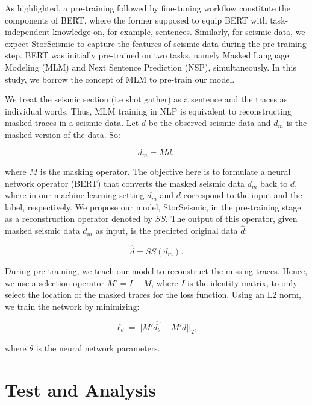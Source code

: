 \documentclass{article}
\begin{document}
As \cite{rogers2020primer} highlighted, a pre-training followed by fine-tuning workflow constitute the components of BERT, where the former supposed to equip BERT with task-independent knowledge on, for example, sentences. Similarly, for seismic data, we expect StorSeismic to capture the features of seismic data during the pre-training step. BERT was initially pre-trained on two tasks, namely Masked Language Modeling (MLM) and Next Sentence Prediction (NSP), simultaneously. In this study, we borrow the concept of MLM to pre-train our model.

We treat the seismic section (i.e shot gather) as a sentence and the traces as individual words. Thus, MLM training in NLP is equivalent to reconstructing masked traces in a seismic data. Let $d$ be the observed seismic data and $d_m$ is the masked version of the data. So:

\begin{equation}
    \label{eq:eq7}
    d_m = Md,
\end{equation}

where $M$ is the masking operator. The objective here is to formulate a neural network operator (BERT) that converts the masked seismic data $d_m$ back to $d$, where in our machine learning setting $d_m$ and $d$ correspond to the input and the label, respectively. We propose our model, StorSeismic, in the pre-training stage as a reconstruction operator denoted by $SS$. The output of this operator, given masked seismic data $d_m$ as input, is the predicted original data $\hat{d}$:

\begin{equation}
    \label{eq:eq8}
    \hat{d} = SS(d_m).
\end{equation}

During pre-training, we teach our model to reconstruct the missing traces. Hence, we use a selection operator $M' = I - M$, where $I$ is the identity matrix, to only select the location of the masked traces for the loss function. Using an L2 norm, we train the network by minimizing:

\begin{equation}
    \label{eq:eq9}
    \ell_{\theta} = ||M'\hat{d_{\theta}} - M'd||_2,
\end{equation}

where $\theta$ is the neural network parameters.

\section{Test and Analysis}
\label{sec:test}
\end{document}

